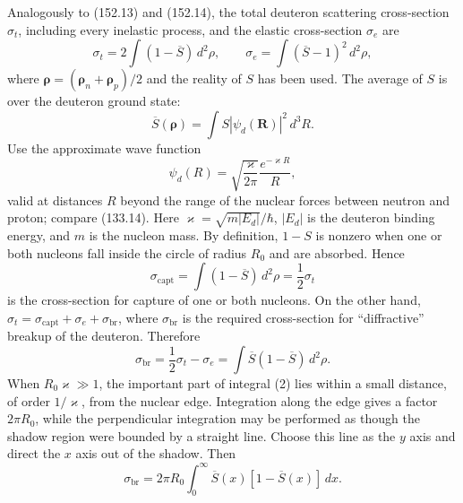Analogously to (152.13) and (152.14), the total deuteron scattering cross-section $\sigma_t$, including every inelastic process, and the elastic cross-section $\sigma_e$ are
\[
 \sigma_t=2\int(1-\overline S)\,d^2\rho,
 \qquad
 \sigma_e=\int(\overline S-1)^2\,d^2\rho,
\]
where $\boldsymbol\rho=(\boldsymbol\rho_n+\boldsymbol\rho_p)/2$ and the reality of $S$ has been used. The average of $S$ is over the deuteron ground state:
\[
 \overline S(\boldsymbol\rho)=\int S|\psi_d(\mathbf R)|^2\,d^3R.
\]
Use the approximate wave function
\[
 \psi_d(R)=\sqrt{\frac{\varkappa}{2\pi}}\frac{e^{-\varkappa R}}R,
\]
valid at distances $R$ beyond the range of the nuclear forces between neutron and proton; compare (133.14). Here $\varkappa=\sqrt{m|E_d|}/\hbar$, $|E_d|$ is the deuteron binding energy, and $m$ is the nucleon mass. By definition, $1-S$ is nonzero when one or both nucleons fall inside the circle of radius $R_0$ and are absorbed. Hence
\begin{equation}
 \sigma_{\mathrm{capt}}=\int(1-\overline S)\,d^2\rho=\frac12\sigma_t
 \tag{1}
\end{equation}
is the cross-section for capture of one or both nucleons. On the other hand, $\sigma_t=\sigma_{\mathrm{capt}}+\sigma_e+\sigma_{\mathrm{br}}$, where $\sigma_{\mathrm{br}}$ is the required cross-section for ``diffractive'' breakup of the deuteron. Therefore
\begin{equation}
 \sigma_{\mathrm{br}}=\frac12\sigma_t-\sigma_e=\int\overline S(1-\overline S)\,d^2\rho.
 \tag{2}
\end{equation}
When $R_0\varkappa\gg1$, the important part of integral (2) lies within a small distance, of order $1/\varkappa$, from the nuclear edge. Integration along the edge gives a factor $2\pi R_0$, while the perpendicular integration may be performed as though the shadow region were bounded by a straight line. Choose this line as the $y$ axis and direct the $x$ axis out of the shadow. Then
\[
 \sigma_{\mathrm{br}}=2\pi R_0\int_0^\infty\overline S(x)[1-\overline S(x)]\,dx.
\]

